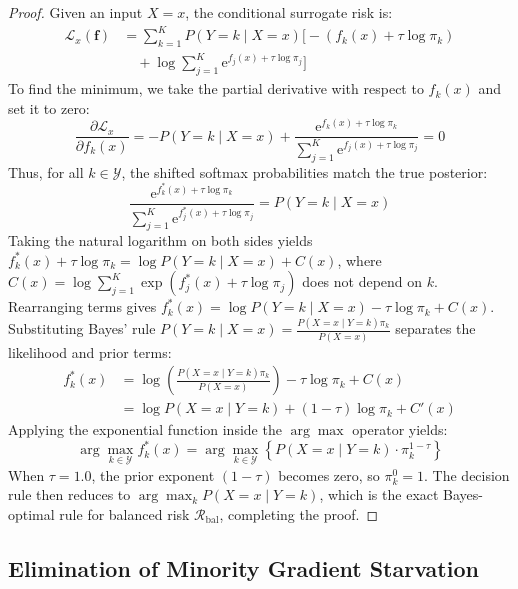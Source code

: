 \documentclass[10pt,journal,compsoc]{IEEEtran}
\begin{document}
\begin{proof}
Given an input $X=x$, the conditional surrogate risk is:
\begin{align}
    \mathcal{L}_x(\mathbf{f}) &= \sum_{k=1}^K P(Y=k \mid X=x) \Big[ -(f_k(x) + \tau \log \pi_k) \nonumber \\
    &\quad + \log \sum_{j=1}^K \mathrm{e}^{f_j(x) + \tau \log \pi_j} \Big]
\end{align}
To find the minimum, we take the partial derivative with respect to $f_k(x)$ and set it to zero:
\begin{equation}
    \frac{\partial \mathcal{L}_x}{\partial f_k(x)} = -P(Y=k \mid X=x) + \frac{\mathrm{e}^{f_k(x) + \tau \log \pi_k}}{\sum_{j=1}^K \mathrm{e}^{f_j(x) + \tau \log \pi_j}} = 0
\end{equation}
Thus, for all $k \in \mathcal{Y}$, the shifted softmax probabilities match the true posterior:
\begin{equation}
    \frac{\mathrm{e}^{f_k^*(x) + \tau \log \pi_k}}{\sum_{j=1}^K \mathrm{e}^{f_j^*(x) + \tau \log \pi_j}} = P(Y=k \mid X=x)
\end{equation}
Taking the natural logarithm on both sides yields $f_k^*(x) + \tau \log \pi_k = \log P(Y=k \mid X=x) + C(x)$, where $C(x) = \log \sum_{j=1}^K \exp(f_j^*(x) + \tau \log \pi_j)$ does not depend on $k$. Rearranging terms gives $f_k^*(x) = \log P(Y=k \mid X=x) - \tau \log \pi_k + C(x)$. Substituting Bayes' rule $P(Y=k \mid X=x) = \frac{P(X=x \mid Y=k) \pi_k}{P(X=x)}$ separates the likelihood and prior terms:
\begin{align}
    f_k^*(x) &= \log \left(\frac{P(X=x \mid Y=k) \pi_k}{P(X=x)}\right) - \tau \log \pi_k + C(x) \nonumber \\
    &= \log P(X=x \mid Y=k) + (1 - \tau) \log \pi_k + C'(x)
\end{align}
Applying the exponential function inside the $\arg\max$ operator yields:
\begin{equation}
    \arg\max_{k \in \mathcal{Y}} f_k^*(x) = \arg\max_{k \in \mathcal{Y}} \left\{ P(X=x \mid Y=k) \cdot \pi_k^{1 - \tau} \right\}
\end{equation}
When $\tau = 1.0$, the prior exponent $(1 - \tau)$ becomes zero, so $\pi_k^0 = 1$. The decision rule then reduces to $\arg\max_k P(X=x \mid Y=k)$, which is the exact Bayes-optimal rule for balanced risk $\mathcal{R}_{\text{bal}}$, completing the proof.
\end{proof}

\subsection{Elimination of Minority Gradient Starvation}
\label{subsec:gradient_starvation}
\end{document}
